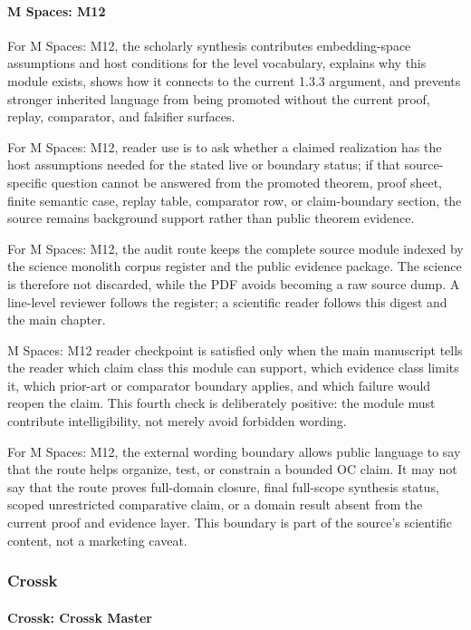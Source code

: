 \paragraph{M Spaces: M12}

For M Spaces: M12, the scholarly synthesis contributes embedding-space assumptions and host conditions for the level vocabulary, explains why this module exists, shows how it connects to the current 1.3.3 argument, and prevents stronger inherited language from being promoted without the current proof, replay, comparator, and falsifier surfaces.


For M Spaces: M12, reader use is to ask whether a claimed realization has the host assumptions needed for the stated live or boundary status; if that source-specific question cannot be answered from the promoted theorem, proof sheet, finite semantic case, replay table, comparator row, or claim-boundary section, the source remains background support rather than public theorem evidence.


For M Spaces: M12, the audit route keeps the complete source module indexed by the science monolith corpus register and the public evidence package. The science is therefore not discarded, while the PDF avoids becoming a raw source dump. A line-level reviewer follows the register; a scientific reader follows this digest and the main chapter.


M Spaces: M12 reader checkpoint is satisfied only when the main manuscript tells the reader which claim class this module can support, which evidence class limits it, which prior-art or comparator boundary applies, and which failure would reopen the claim. This fourth check is deliberately positive: the module must contribute intelligibility, not merely avoid forbidden wording.


For M Spaces: M12, the external wording boundary allows public language to say that the route helps organize, test, or constrain a bounded OC claim. It may not say that the route proves full-domain closure, final full-scope synthesis status, scoped unrestricted comparative claim, or a domain result absent from the current proof and evidence layer. This boundary is part of the source's scientific content, not a marketing caveat.


\subsubsection{Crossk}

\paragraph{Crossk: Crossk Master}

